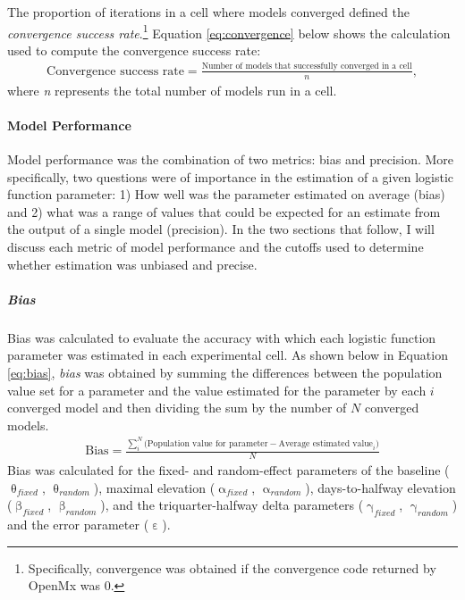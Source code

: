 \documentclass[
12pt, %
twoside,
english]{guelphthesis}
\begin{document}
The proportion of iterations in a cell where models converged defined the \emph{convergence success rate}.\footnote{Specifically, convergence was obtained if the convergence code returned by OpenMx was 0.} Equation \eqref{eq:convergence} below shows the calculation used to compute the convergence success rate:
\begin{align}
  \text{Convergence success rate} =  \frac{\text{Number of models that successfully converged in a cell}}{n},
  \label{eq:convergence} 
\end{align}
\noindent where \emph{n} represents the total number of models run in a cell.

\hypertarget{model-performance}{%
\paragraph{Model Performance}\label{model-performance}}

Model performance was the combination of two metrics: bias and precision. More specifically, two questions were of importance in the estimation of a given logistic function parameter: 1) How well was the parameter estimated on average (bias) and 2) what was a range of values that could be expected for an estimate from the output of a single model (precision). In the two sections that follow, I will discuss each metric of model performance and the cutoffs used to determine whether estimation was unbiased and precise.

\hypertarget{bias-comp}{%
\subparagraph{Bias}\label{bias-comp}}

Bias was calculated to evaluate the accuracy with which each logistic function parameter was estimated in each experimental cell. As shown below in Equation \eqref{eq:bias}, \emph{bias} was obtained by summing the differences between the population value set for a parameter and the value estimated for the parameter by each \(i\) converged model and then dividing the sum by the number of \(N\) converged models.
\begin{align}
  \text{Bias} = \frac{\sum_i^N\text{(Population value for parameter} - \text{Average estimated value}_i)}{N}
  \label{eq:bias} 
\end{align}
\noindent Bias was calculated for the fixed- and random-effect parameters of the baseline (\(\uptheta_{fixed}\), \(\uptheta_{random}\)), maximal elevation (\(\upalpha_{fixed}\), \(\upalpha_{random}\)), days-to-halfway elevation (\(\upbeta_{fixed}\), \(\upbeta_{random}\)), and the triquarter-halfway delta parameters (\(\upgamma_{fixed}\), \(\upgamma_{random}\)) and the error parameter (\(\upepsilon\)).
\end{document}
